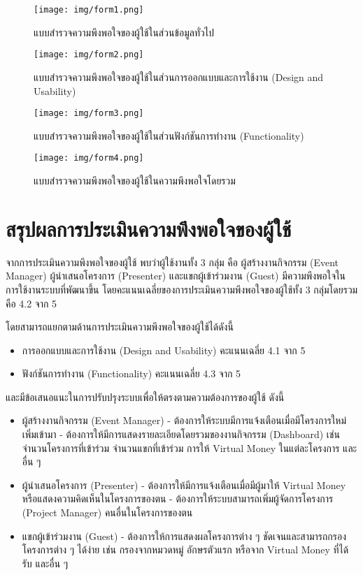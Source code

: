 \begin{figure}
    \centering
    \texttt{[image: img/form1.png]}
    \caption{แบบสำรวจความพึงพอใจของผู้ใช้ในส่วนข้อมูลทั่วไป}
    \label{fig:survey1}
\end{figure}

\begin{figure}
    \centering
    \texttt{[image: img/form2.png]}
    \caption{แบบสำรวจความพึงพอใจของผู้ใช้ในส่วนการออกแบบและการใช้งาน (Design and Usability)}
    \label{fig:survey2}
\end{figure}

\begin{figure}
    \centering
    \texttt{[image: img/form3.png]}
    \caption{แบบสำรวจความพึงพอใจของผู้ใช้ในส่วนฟังก์ชันการทำงาน (Functionality)}
    \label{fig:survey3}
\end{figure}

\begin{figure}
    \centering
    \texttt{[image: img/form4.png]}
    \caption{แบบสำรวจความพึงพอใจของผู้ใช้ในความพึงพอใจโดยรวม}
    \label{fig:survey4}
\end{figure}

\clearpage %
\section{สรุปผลการประเมินความพึงพอใจของผู้ใช้}
จากการประเมินความพึงพอใจของผู้ใช้ พบว่าผู้ใช้งานทั้ง 3 กลุ่ม คือ
ผู้สร้างงานกิจกรรม (Event Manager) ผู้นำเสนอโครงการ (Presenter)
และแขกผู้เข้าร่วมงาน (Guest) มีความพึงพอใจในการใช้งานระบบที่พัฒนาขึ้น
โดยคะแนนเฉลี่ยของการประเมินความพึงพอใจของผู้ใช้ทั้ง 3 กลุ่มโดยรวม คือ 4.2
จาก 5


โดยสามารถแยกตามด้านการประเมินความพึงพอใจของผู้ใช้ได้ดังนี้
\begin{itemize}
    \item การออกแบบและการใช้งาน (Design and Usability) คะแนนเฉลี่ย 4.1 จาก 5
    \item ฟังก์ชันการทำงาน (Functionality) คะแนนเฉลี่ย 4.3 จาก 5
\end{itemize}

และมีข้อเสนอแนะในการปรับปรุงระบบเพื่อให้ตรงตามความต้องการของผู้ใช้ ดังนี้
\begin{itemize}
    \item ผู้สร้างงานกิจกรรม (Event Manager)
          \subitem - ต้องการให้ระบบมีการแจ้งเตือนเมื่อมีโครงการใหม่เพิ่มเข้ามา
          \subitem - ต้องการให้มีการแสดงรายละเอียดโดยรวมของงานกิจกรรม (Dashboard) เช่น จำนวนโครงการที่เข้าร่วม จำนวนแขกที่เข้าร่วม การให้ Virtual Money ในแต่ละโครงการ และอื่น ๆ
    \item ผู้นำเสนอโครงการ (Presenter)
          \subitem - ต้องการให้มีการแจ้งเตือนเมื่อมีผู้มาให้ Virtual Money หรือแสดงความคิดเห็นในโครงการของตน
          \subitem - ต้องการให้ระบบสามารถเพิ่มผู้จัดการโครงการ (Project Manager) คนอื่นในโครงการของตน
    \item แขกผู้เข้าร่วมงาน (Guest)
          \subitem - ต้องการให้การแสดงผลโครงการต่าง ๆ ชัดเจนและสามารถกรองโครงการต่าง ๆ ได้ง่าย เช่น กรองจากหมวดหมู่ อักษรตัวแรก หรือจาก Virtual Money ที่ได้รับ และอื่น ๆ
\end{itemize}
